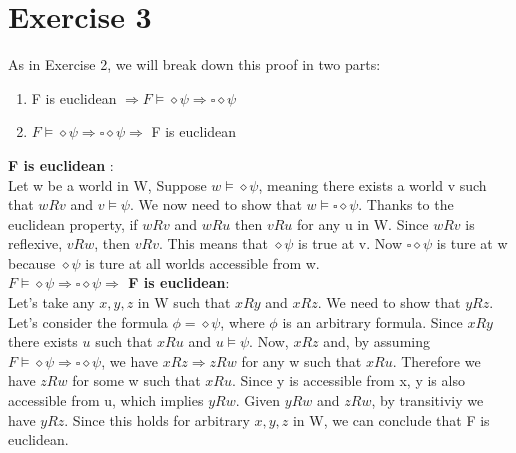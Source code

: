 \documentclass[11pt]{exam}
\begin{document}
\section*{Exercise 3}
As in Exercise 2, we will break down this proof in two parts:
\begin{enumerate}
    \item F is euclidean \(\Rightarrow F \vDash \diamond \psi \Rightarrow \square \diamond \psi\)
    \item \(F \vDash \diamond \psi \Rightarrow \square \diamond \psi \Rightarrow\) F is euclidean
\end{enumerate}
\textbf{F is euclidean} : \\
Let w be a world in W, Suppose \(w \vDash \diamond \psi\), meaning there exists a world v such that \(wRv\) and \(v \vDash \psi\).
We now need to show that \(w \vDash \square \diamond \psi\). Thanks to the euclidean property, if \(wRv\) and \(wRu\) then \(vRu\) for any u in W.
Since \(wRv\) is reflexive, \(vRw\), then \(vRv\). This means that \(\diamond \psi\) is true at v. Now \(\square \diamond \psi\) is ture at w because \(\diamond \psi\) is ture at all worlds accessible from w. \\
\textbf{\(F \vDash \diamond \psi \Rightarrow \square \diamond \psi \Rightarrow\) F is euclidean}: \\
Let's take any \(x, y, z\) in W such that \(xRy\) and \(xRz\). We need to show that \(yRz\).
Let's consider the formula \(\phi = \diamond \psi\), where \(\phi\) is an arbitrary formula. Since \(xRy\) there exists \(u\) such that \(xRu\) and \(u \vDash \psi\).
Now, \(xRz\) and, by assuming \(F \vDash \diamond \psi \Rightarrow \square \diamond \psi\), we have \(xRz \Rightarrow zRw\) for any w such that \(xRu\).
Therefore we have \(zRw\) for some w such that \(xRu\). Since y is accessible from x, y is also accessible from u, which implies \(yRw\).
Given \(yRw\) and \(zRw\), by transitiviy we have \(yRz\).
Since this holds for arbitrary \(x, y, z\) in W, we can conclude that F is euclidean.
\end{document}
